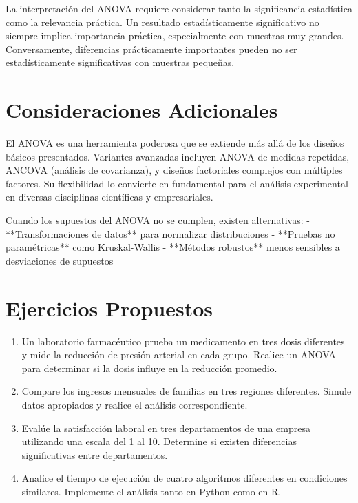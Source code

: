 \begin{remark}
La interpretación del ANOVA requiere considerar tanto la significancia estadística como la relevancia práctica. Un resultado estadísticamente significativo no siempre implica importancia práctica, especialmente con muestras muy grandes. Conversamente, diferencias prácticamente importantes pueden no ser estadísticamente significativas con muestras pequeñas.
\end{remark}

\section{Consideraciones Adicionales}

\begin{remark}
El ANOVA es una herramienta poderosa que se extiende más allá de los diseños básicos presentados. Variantes avanzadas incluyen ANOVA de medidas repetidas, ANCOVA (análisis de covarianza), y diseños factoriales complejos con múltiples factores. Su flexibilidad lo convierte en fundamental para el análisis experimental en diversas disciplinas científicas y empresariales.
\end{remark}

Cuando los supuestos del ANOVA no se cumplen, existen alternativas:
- **Transformaciones de datos** para normalizar distribuciones
- **Pruebas no paramétricas** como Kruskal-Wallis
- **Métodos robustos** menos sensibles a desviaciones de supuestos

\section{Ejercicios Propuestos}

\begin{enumerate}
    \item Un laboratorio farmacéutico prueba un medicamento en tres dosis diferentes y mide la reducción de presión arterial en cada grupo. Realice un ANOVA para determinar si la dosis influye en la reducción promedio.
    
    \item Compare los ingresos mensuales de familias en tres regiones diferentes. Simule datos apropiados y realice el análisis correspondiente.
    
    \item Evalúe la satisfacción laboral en tres departamentos de una empresa utilizando una escala del 1 al 10. Determine si existen diferencias significativas entre departamentos.
    
    \item Analice el tiempo de ejecución de cuatro algoritmos diferentes en condiciones similares. Implemente el análisis tanto en Python como en R.
\end{enumerate}

